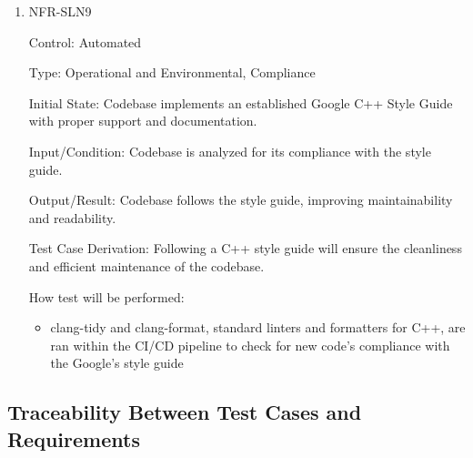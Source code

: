 \documentclass[12pt, titlepage]{article}
\begin{document}
\begin{enumerate}
\item NFR-SLN9

Control: Automated

Type: Operational and Environmental, Compliance

Initial State: Codebase implements an established Google C++ Style Guide with proper support and documentation.

Input/Condition: Codebase is analyzed for its compliance with the style guide.

Output/Result: Codebase follows the style guide, improving maintainability and readability.

Test Case Derivation: Following a C++ style guide will ensure the cleanliness and efficient maintenance of the codebase.

How test will be performed:
\begin{itemize}
  \item clang-tidy and clang-format, standard linters and formatters for C++, are ran within the CI/CD pipeline to check for new code’s compliance with the Google's style guide
\end{itemize}

\end{enumerate}


\subsection{Traceability Between Test Cases and Requirements}
\end{document}
